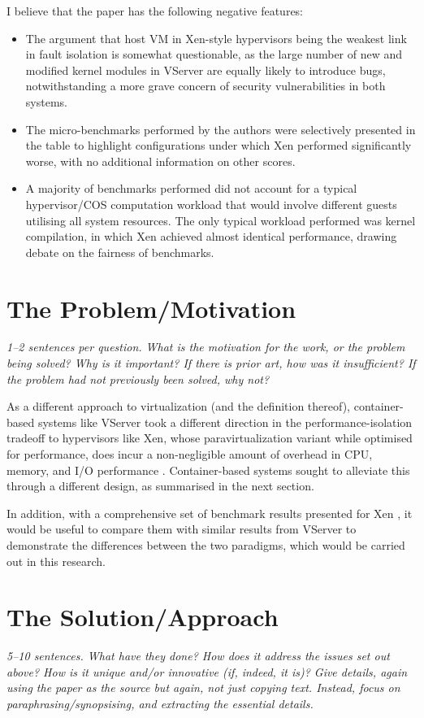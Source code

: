 \documentclass[11pt]{article}
\begin{document}
I believe that the paper has the following negative features:
\begin{itemize}
	\item The argument that host VM in Xen-style hypervisors being the weakest link in fault isolation is somewhat questionable, as the large number of new and modified kernel modules in VServer are equally likely to introduce bugs, notwithstanding a more grave concern of security vulnerabilities in both systems.
	\item The micro-benchmarks performed by the authors were selectively presented in the table to highlight configurations under which Xen performed significantly worse, with no additional information on other scores.
	\item A majority of benchmarks performed did not account for a typical hypervisor/COS computation workload that would involve different guests utilising all system resources. The only typical workload performed was kernel compilation, in which Xen achieved almost identical performance, drawing debate on the fairness of benchmarks.
\end{itemize}

\section*{The Problem/Motivation}
\textsl{1--2 sentences per question. What is the motivation for the work, or the problem being solved? Why is it important? If there is prior art, how was it insufficient? If the problem had not previously been solved, why not?}

As a different approach to virtualization (and the definition thereof), container-based systems like VServer took a different direction in the performance-isolation tradeoff to hypervisors like Xen, whose paravirtualization variant while optimised for performance, does incur a non-negligible amount of overhead in CPU, memory, and I/O performance \cite[Sec. 4]{barham2003xen}. Container-based systems sought to alleviate this through a different design, as summarised in the next section.

In addition, with a comprehensive set of benchmark results presented for Xen \cite[Sec. 4]{barham2003xen}, it would be useful to compare them with similar results from VServer to demonstrate the differences between the two paradigms, which would be carried out in this research.

\section*{The Solution/Approach}
\textsl{5--10 sentences. What have they done? How does it address the issues set out above? How is it unique and/or innovative (if, indeed, it is)? Give details, again using the paper as the source but again, not just copying text. Instead, focus on paraphrasing/synopsising, and extracting the essential details.}
\end{document}
